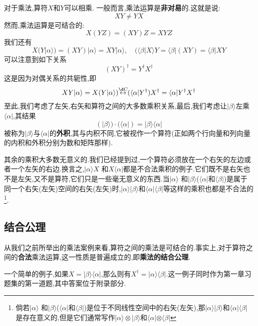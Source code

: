 \documentclass[lang=cn,newtx,10pt,scheme=chinese,thmcnt=section]{elegantbook}
\begin{document}
对于乘法,算符$X$和$Y$可以相乘. 一般而言,乘法运算是\textbf{非对易}的.这就是说:
\begin{equation}
	XY\ne YX 
\end{equation}
然而,乘法运算是可结合的:
\begin{equation}
	X(YZ)=(XY)Z=XYZ
\end{equation}
我们还有
$$X(Y|\alpha\rangle)=(XY)|\alpha\rangle=XY|\alpha\rangle,\quad(\langle\beta|X\rangle Y=\langle\beta|(XY)=\langle\beta|XY$$
可以注意到如下关系
\begin{equation}
	(XY)^\dagger=Y^\dagger X^\dagger
\end{equation}
这是因为对偶关系的共轭性,即
\begin{equation}
	XY|\alpha\rangle=X(Y|\alpha\rangle)\overset{\mathrm{\d C}}{\operatorname*{\leftrightarrow}}(\langle\alpha|Y^\dagger)X^\dagger=\langle\alpha|Y^\dagger X^\dagger 
\end{equation}
至此,我们考虑了左矢,右矢和算符之间的大多数乘积关系,最后,我们考虑让$|\beta\rangle$左乘$\langle\alpha|$,其结果
\begin{equation}
	(|\beta\rangle)\cdot(\langle\alpha|)=|\beta\rangle\langle\alpha|
\end{equation}
被称为$|\beta\rangle$与$\langle\alpha|$的\textbf{外积},其与内积不同,它被视作一个算符(正如两个行向量和列向量的内积和外积分别为数和矩阵那样).

其余的乘积大多数无意义的.我们已经提到过,一个算符必须放在一个右矢的左边或者一个左矢的右边.换言之,$|\alpha\rangle X$ 和$X\langle\alpha|$都是不合法乘积的例子.它们既不是右矢也不是左矢,又不是算符,它们只是一些毫无意义的东西.当$|\alpha\rangle$ 和$|\beta\rangle$($\langle\alpha|$和$\langle\beta|$)是属于同一个右矢(左矢)空间的右矢(左矢)时,$|\alpha\rangle|\beta\rangle$和$\langle\alpha|\langle\beta|$等这样的乘积也都是不合法的\footnote{倘若$|\alpha\rangle$ 和$|\beta\rangle$($\langle\alpha|$和$\langle\beta|$)是位于不同线性空间中的右矢(左矢),那$|\alpha\rangle|\beta\rangle$和$\langle\alpha|\langle\beta|$是存在意义的,但是它们通常写作$|\alpha\rangle\otimes|\beta\rangle$和$\langle\alpha|\otimes\langle\beta|$}.
\subsection*{结合公理}
从我们之前所举出的乘法案例来看,算符之间的乘法是可结合的.事实上,对于算符之间的\textbf{合法}乘法运算,这一性质是普遍成立的,即\textbf{乘法的结合公理}.

一个简单的例子,如果$X=|\beta\rangle\langle\alpha|$,那么则有$X^\dagger=|\alpha\rangle\langle\beta|$.这一例子同时作为第一章习题集的第一道题,其中答案位于附录部分.
\end{document}
